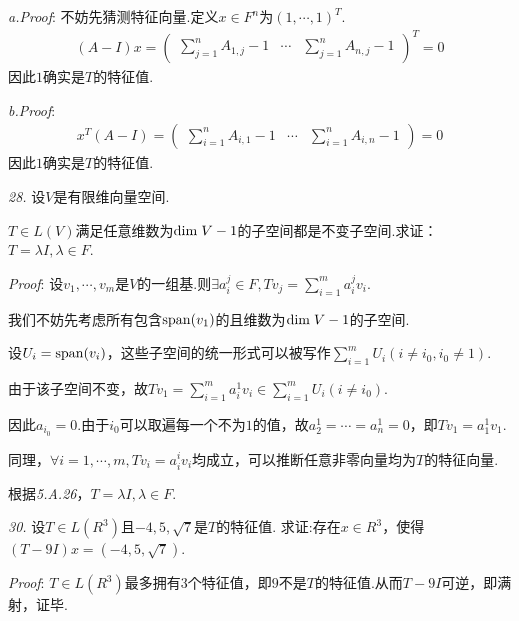 \textit{a.Proof}:
不妨先猜测特征向量.定义\(x \in F^n\)为\((1,\cdots,1)^T\).
    \begin{align*}
        (A-I)x=
            \begin{pmatrix}
                \sum_{j=1}^n A_{1,j}-1 & \cdots & \sum_{j=1}^n A_{n,j}-1
            \end{pmatrix}^T
            =0
    \end{align*}
因此\(1\)确实是\(T\)的特征值.

\textit{b.Proof}:
    \begin{align*}
        x^T(A-I)=
            \begin{pmatrix}
                \sum_{i=1}^n A_{i,1}-1 & \cdots & \sum_{i=1}^n A_{i,n}-1
            \end{pmatrix}
                =0
    \end{align*}
因此\(1\)确实是\(T\)的特征值.

\hspace*{\fill}

\textit{28.}
设\(V\)是有限维向量空间.

\(T \in L(V)\)满足任意维数为\(\mathrm{dim \;} V-1\)的子空间都是不变子空间.求证：\(T=\lambda I,\lambda \in F\).

\textit{Proof}:
设\(v_1,\cdots,v_m\)是\(V\)的一组基.则\(\exists a_i^j \in F,Tv_j=\sum_{i=1}^m a_i^j v_i\).

我们不妨先考虑所有包含\(\mathrm{span} (v_1)\)的且维数为\(\mathrm{dim \;} V-1\)的子空间.

设\(U_i=\mathrm{span} (v_i)\)，这些子空间的统一形式可以被写作\(\sum_{i=1}^m U_i(i \ne i_0,i_0 \ne 1)\).

由于该子空间不变，故\(Tv_1=\sum_{i=1}^m a_i^1 v_i \in \sum_{i=1}^m U_i(i \ne i_0)\).

因此\(a_{i_0}=0\).由于\(i_0\)可以取遍每一个不为\(1\)的值，故\(a_2^1=\cdots=a_n^1=0\)，即\(Tv_1=a_1^1 v_1\).

同理，\(\forall i=1,\cdots,m,Tv_i=a_i^i v_i\)均成立，可以推断任意非零向量均为\(T\)的特征向量.

根据\textit{5.A.26}，\(T=\lambda I,\lambda \in F\).

\hspace*{\fill}

\textit{30.}
设\(T \in L(R^3)\)且\(-4,5,\sqrt{7}\)是\(T\)的特征值.
求证:存在\(x \in R^3\)，使得\((T-9I)x=(-4,5,\sqrt{7})\).

\textit{Proof}:
\(T \in L(R^3)\)最多拥有\(3\)个特征值，即\(9\)不是\(T\)的特征值.从而\(T-9I\)可逆，即满射，证毕.

\newpage

